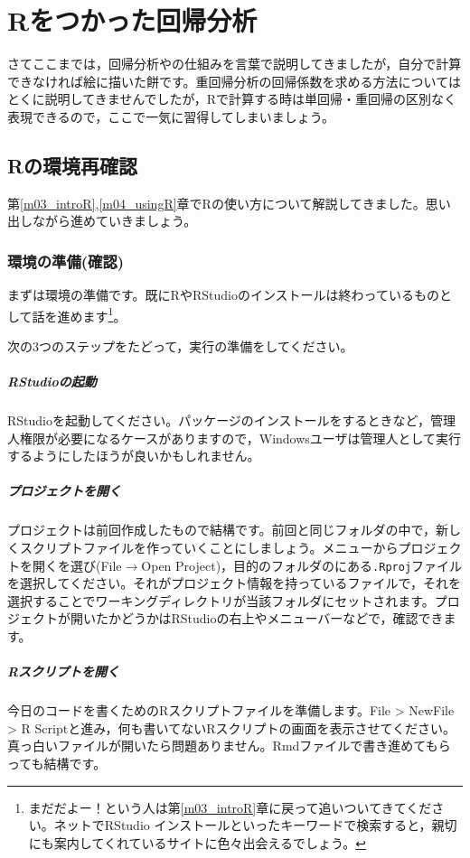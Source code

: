 \documentclass{ltjbook}
\begin{document}
\VerbatimFootnotes
\chapter{Rをつかった回帰分析}
\label{m11_MRonR}

さてここまでは，回帰分析やの仕組みを言葉で説明してきましたが，自分で計算できなければ絵に描いた餅です。重回帰分析の回帰係数を求める方法についてはとくに説明してきませんでしたが，Rで計算する時は単回帰・重回帰の区別なく表現できるので，ここで一気に習得してしまいましょう。

\section{Rの環境再確認}
第\ref{m03_introR},\ref{m04_usingR}章でRの使い方について解説してきました。思い出しながら進めていきましょう。

\subsection{環境の準備(確認)}
まずは環境の準備です。既にRやRStudioのインストールは終わっているものとして話を進めます\footnote{まだだよー！という人は第\ref{m03_introR}章に戻って追いついてきてください。ネットでRStudio インストールといったキーワードで検索すると，親切にも案内してくれているサイトに色々出会えるでしょう。}。

次の3つのステップをたどって，実行の準備をしてください。
\paragraph{RStudioの起動}RStudioを起動してください。パッケージのインストールをするときなど，管理人権限が必要になるケースがありますので，Windowsユーザは管理人として実行するようにしたほうが良いかもしれません。
\paragraph{プロジェクトを開く}プロジェクトは前回作成したもので結構です。前回と同じフォルダの中で，新しくスクリプトファイルを作っていくことにしましょう。メニューからプロジェクトを開くを選び(File$\to$Open Project)，目的のフォルダのにある\texttt{.Rproj}ファイルを選択してください。それがプロジェクト情報を持っているファイルで，それを選択することでワーキングディレクトリが当該フォルダにセットされます。プロジェクトが開いたかどうかはRStudioの右上やメニューバーなどで，確認できます。
\paragraph{Rスクリプトを開く}今日のコードを書くためのRスクリプトファイルを準備します。File > NewFile > R Scriptと進み，何も書いてないRスクリプトの画面を表示させてください。真っ白いファイルが開いたら問題ありません。Rmdファイルで書き進めてもらっても結構です。
\end{document}
